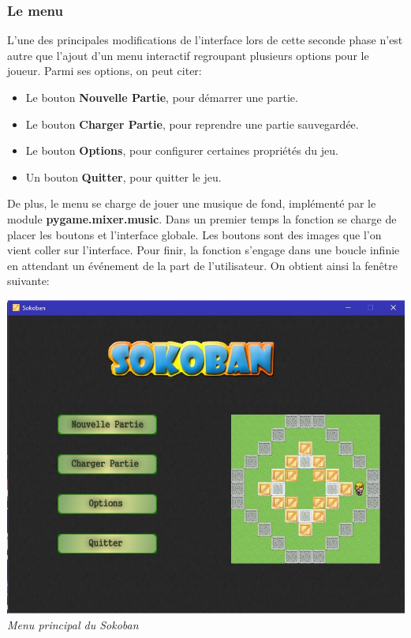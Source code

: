 \documentclass{article}
\begin{document}
			\subsubsection{Le menu}
	L'une des principales modifications de l'interface lors de cette seconde phase n'est autre que l'ajout d'un menu interactif regroupant plusieurs options pour le joueur. Parmi ses options, on peut citer:
\begin{itemize}
\item Le bouton \textbf{Nouvelle Partie}, pour démarrer une partie.
\item Le bouton \textbf{Charger Partie}, pour reprendre une partie sauvegardée.
\item Le bouton \textbf{Options}, pour configurer certaines propriétés du jeu.
\item Un bouton \textbf{Quitter}, pour quitter le jeu.
\end{itemize}
De plus, le menu se charge de jouer une musique de fond, implémenté par le module \textbf{pygame.mixer.music}.\newline
Dans un premier temps la fonction se charge de placer les boutons et l'interface globale. Les boutons sont des images que l'on vient coller sur l'interface. Pour finir, la fonction s'engage dans une boucle infinie en 
attendant un événement de la part de l'utilisateur. On obtient ainsi la fenêtre suivante: 

\begin{center}
\includegraphics[scale=0.5]{img/menu-interface.jpg} \newline
\textit{Menu principal du Sokoban}
\end{center}
\end{document}
